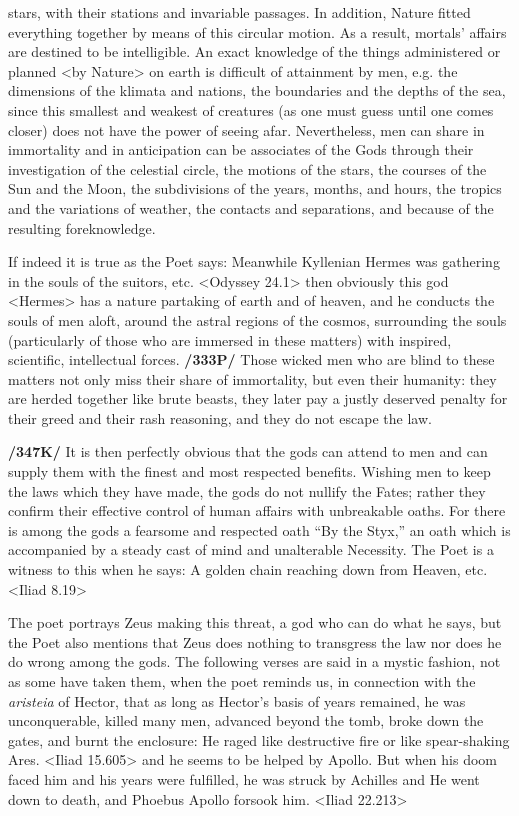 stars, with their stations and invariable passages. In addition, Nature fitted everything together by means of this
circular motion. As a result, mortals’ affairs are destined to be intelligible. An exact knowledge of the things administered or planned <by Nature> on earth is difficult of attainment by men, e.g. the dimensions of the klimata and nations, the boundaries and the depths of the sea, since this smallest and weakest of creatures (as one must guess until one comes closer) does not have the power of seeing afar. Nevertheless, men can share in immortality and in anticipation can be associates of the Gods through their investigation of the celestial circle, the motions of the stars, the courses of the Sun and the Moon, the subdivisions of the years, months, and hours, the tropics and the variations of weather, the contacts and separations, and because of the resulting foreknowledge.

If indeed it is true as the Poet says: Meanwhile Kyllenian Hermes was gathering in the souls of the suitors, etc. <Odyssey 24.1> then obviously this god <Hermes> has a nature partaking of earth and of heaven, and he conducts the souls of men aloft, around the astral regions of the cosmos, surrounding the souls (particularly of those who are immersed in these matters) with inspired, scientific, intellectual forces. \textbf{/333P/} Those wicked men who are blind to these matters not only miss their share of immortality, but even their humanity: they are herded together like brute beasts, they later pay a justly deserved penalty for their greed and their rash reasoning, and they do not escape the law.

\textbf{/347K/} It is then perfectly obvious that the gods can attend to men and can supply them with the finest and most respected benefits. Wishing men to keep the laws which they have made, the gods do not nullify the Fates; rather they confirm their effective control of human affairs with unbreakable oaths. For there is among the gods a fearsome and respected oath “By the Styx,” an oath which is accompanied by a steady cast of mind and unalterable Necessity. The Poet is a witness to this when he says: A golden chain reaching down from Heaven, etc. <Iliad 8.19>

The poet portrays Zeus making this threat, a god who can do what he says, but the Poet also mentions that Zeus does nothing to transgress the law nor does he do wrong among the gods. The following verses are said in a mystic fashion, not as some have taken them, when the poet reminds us, in connection with the \textit{aristeia} of Hector, that as long as Hector’s basis of years remained, he was unconquerable, killed many men, advanced beyond the tomb, broke down the gates, and burnt the enclosure: He raged like destructive fire or like spear-shaking Ares. <Iliad 15.605> and he seems to be helped by Apollo. But when his doom faced him and his years were fulfilled, he was struck by Achilles and He went down to death, and Phoebus Apollo forsook him. <Iliad 22.213>

